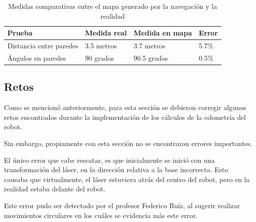 \begin{table}[H]
  \centering
  \begin{tabular}{@{}llll@{}}
  \toprule
  \textbf{Prueba} & \textbf{Medida real} & \textbf{Medida en mapa} & \textbf{Error} \\ \midrule
  Distancia entre paredes & 3.5 metros & 3.7 metros & 5.7\% \\
  Ángulos en paredes & 90 grados & 90.5 grados & 0.5\% \\ \bottomrule
  \end{tabular}
  \caption{Medidas comparativas entre el mapa generado por la navegación y la realidad}
  \label{tab:medidas_comparativas}
  \end{table}

\subsection{Retos}

Como se mencionó anteriormente, para esta sección se debieron corregir algunos
retos encontrados durante la implementación de los cálculos de la
odometría del robot.

Sin embargo, propiamente con esta sección no se encontraron errores importantes.

El único error que cabe rescatar, es que inicialmente se inició con una
transformación del láser, en la dirección relativa a la base incorrecta.
Esto causaba que virtualmente, el láser estuviera atrás del centro del robot,
pero en la realidad estaba delante del robot.

Este error pudo ser detectado por el profesor Federico Ruíz, al sugerir
realizar movimientos circulares en los cuáles se evidencia más este error.

